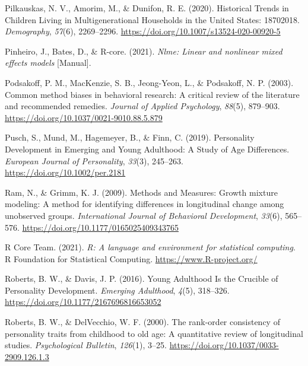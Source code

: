 \documentclass[
  english,
  man, noextraspace]{apa7}
\begin{document}
\leavevmode\hypertarget{ref-pilkauskasHistoricalTrendsChildren2020}{}%
Pilkauskas, N. V., Amorim, M., \& Dunifon, R. E. (2020). Historical Trends in Children Living in Multigenerational Households in the United States: 18702018. \emph{Demography}, \emph{57}(6), 2269--2296. \url{https://doi.org/10.1007/s13524-020-00920-5}

\leavevmode\hypertarget{ref-R-nlme}{}%
Pinheiro, J., Bates, D., \& R-core. (2021). \emph{Nlme: Linear and nonlinear mixed effects models} {[}Manual{]}.

\leavevmode\hypertarget{ref-podsakoffCommonMethodBiases2003}{}%
Podsakoff, P. M., MacKenzie, S. B., Jeong-Yeon, L., \& Podsakoff, N. P. (2003). Common method biases in behavioral research: A critical review of the literature and recommended remedies. \emph{Journal of Applied Psychology}, \emph{88}(5), 879--903. \url{https://doi.org/10.1037/0021-9010.88.5.879}

\leavevmode\hypertarget{ref-puschPersonalityDevelopmentEmerging2019}{}%
Pusch, S., Mund, M., Hagemeyer, B., \& Finn, C. (2019). Personality Development in Emerging and Young Adulthood: A Study of Age Differences. \emph{European Journal of Personality}, \emph{33}(3), 245--263. \url{https://doi.org/10.1002/per.2181}

\leavevmode\hypertarget{ref-ramMethodsMeasuresGrowth2009}{}%
Ram, N., \& Grimm, K. J. (2009). Methods and Measures: Growth mixture modeling: A method for identifying differences in longitudinal change among unobserved groups. \emph{International Journal of Behavioral Development}, \emph{33}(6), 565--576. \url{https://doi.org/10.1177/0165025409343765}

\leavevmode\hypertarget{ref-R-base}{}%
R Core Team. (2021). \emph{R: A language and environment for statistical computing}. R Foundation for Statistical Computing. \url{https://www.R-project.org/}

\leavevmode\hypertarget{ref-robertsYoungAdulthoodCrucible2016}{}%
Roberts, B. W., \& Davis, J. P. (2016). Young Adulthood Is the Crucible of Personality Development. \emph{Emerging Adulthood}, \emph{4}(5), 318--326. \url{https://doi.org/10.1177/2167696816653052}

\leavevmode\hypertarget{ref-robertsRankorderConsistencyPersonality2000}{}%
Roberts, B. W., \& DelVecchio, W. F. (2000). The rank-order consistency of personality traits from childhood to old age: A quantitative review of longitudinal studies. \emph{Psychological Bulletin}, \emph{126}(1), 3--25. \url{https://doi.org/10.1037/0033-2909.126.1.3}
\end{document}
